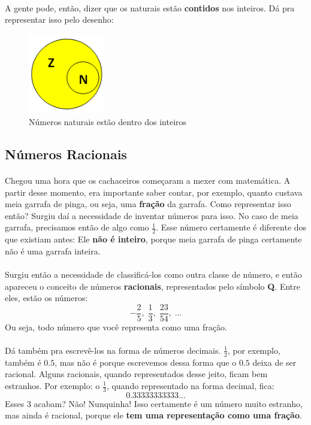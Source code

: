 \documentclass[11pt]{article}
\begin{document}
\paragraph{}
A gente pode, então, dizer que os naturais estão \textbf{contidos} nos inteiros.
Dá pra representar isso pelo desenho:
\begin{figure}[H]
  		\centering
    	\includegraphics[width=0.3\textwidth]{imgs/n_z.png}
		\caption[9pt]{Números naturais estão dentro dos inteiros}
\end{figure}

\subsection{Números Racionais}
\paragraph{}
Chegou uma hora que os cachaceiros começaram a mexer com matemática. A partir
desse momento, era importante saber contar, por exemplo, quanto custava meia
garrafa de pinga, ou seja, uma \textbf{fração} da garrafa. 
Como representar isso então? Surgiu daí a necessidade de inventar números para
isso. No caso de meia garrafa, precisamos então de algo como $\frac{1}{2}$.
Esse número certamente é diferente dos que existiam antes: Ele 
\textbf{não é inteiro}, porque meia garrafa de pinga certamente não é uma 
garrafa inteira. 
\paragraph{}
Surgiu então a necessidade de classificá-los como outra classe de número, e 
então apareceu o conceito de números \textbf{racionais}, representados pelo
símbolo \textbf{Q}. Entre eles, estão os números:
$$-\frac{2}{5}, \; \frac{1}{3}, \; \frac{23}{54}, \; \dots$$
Ou seja, todo número que você representa como uma fração. 
\paragraph{}
Dá também pra escrevê-los na forma de números decimais. $\frac{1}{2}$, 
por exemplo, também é $0.5$, mas não é porque escrevemos dessa forma que 
o $0.5$ deixa de ser racional. Alguns racionais, quando representados desse
jeito, ficam bem estranhos. Por exemplo: o $\frac{1}{3}$, quando representado
na forma decimal, fica:
$$0.33333333333 \dots$$
Esses 3 acabam? Não! Nunquinha! Isso certamente é um número muito estranho, mas
ainda é racional, porque ele \textbf{tem uma representação como uma fração}.
\end{document}
